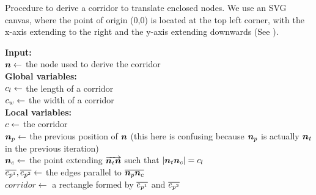 \begin{algorithm}[tb!]
    \caption{Procedure to derive a corridor to translate enclosed nodes. We use an SVG canvas, where the point of origin (0,0) is located at the top left corner, with the x-axis extending to the right and the y-axis extending downwards (See ).}\label{alg:derive corridor}

    \textbf{Input:} \\
    $ \bm{n} \gets $ the node used to derive the corridor \\

    \textbf{Global variables:} \\
    $ c_l \gets $ the length of a corridor \\
    $ c_w \gets $ the width of a corridor \\

    \textbf{Local variables:} \\
    $ c \gets $ the corridor \\
    $ \bm{n}_{p} \gets $ the previous position of $ \bm{n} $ (this here is confusing because $ \bm{n}_{p} $ is actually $ \bm{n}_t $ in the previous iteration)\\
    $ \bm{n}_c \gets $ the point extending $ \protect\overrightarrow{\bm{n}_t\bm{n}} $ such that $ \lvert \bm{n}_t\bm{n}_c \rvert = c_l $\\
    $ \protect\overline{e_{p^1}}, \protect\overline{e_{p^2}} \gets $ the edges parallel to $ \protect\overline{\bm{n}_{p}\bm{n}_c} $ \\
    $ corridor \gets $ a rectangle formed by $ \protect\overline{e_{p^1}} $ and $ \protect\overline{e_{p^2}} $ \\

\end{algorithm}
